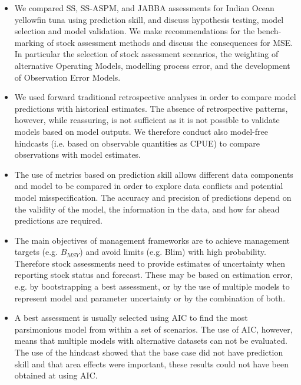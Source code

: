 \begin{itemize}
    \item  We  compared SS, SS-ASPM, and JABBA assessments for Indian Ocean yellowfin tuna  using prediction skill, and discuss hypothesis testing, model selection and model validation. We make recommendations for the bench-marking of stock assessment methods and discuss the consequences for MSE. In particular the selection of stock assessment scenarios, the weighting of alternative Operating Models, modelling process error, and the development of Observation Error Models.   

   \item We used forward traditional retrospective analyses in order to compare model predictions with historical estimates. The absence of retrospective patterns, however, while reassuring, is not sufficient as it is not possible to validate models based on model outputs. We therefore conduct also model-free hindcasts (i.e. based on observable quantities as CPUE) to compare observations with model estimates. 
   
   \item The use of metrics based on prediction skill allows different data components and model to be compared in order to explore data conflicts and potential model misspecification. The accuracy and precision of predictions depend on the validity of the model, the information in the data, and how far ahead predictions are required. 
   
   \item The main objectives of management frameworks are to achieve management targets (e.g. $B_{MSY}$) and avoid limits (e.g. Blim) with high probability. Therefore stock assessments need to provide estimates of uncertainty when reporting stock status and forecast. These may be based on estimation error, e.g.  by bootstrapping a best assessment, or by the use of multiple models to represent model and parameter uncertainty or by the combination of both. 

  \item A best assessment is usually selected using AIC to find the most parsimonious model from within a set of scenarios. The use of AIC, however, means that multiple models with alternative datasets can not be evaluated. The use of the hindcast showed that the base case did not have prediction skill and that area effects were important, these results could not have been obtained at using AIC. 


\end{itemize}

